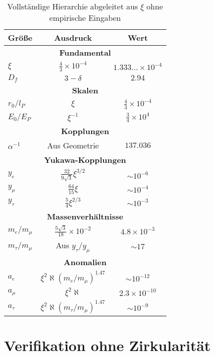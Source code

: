 \documentclass[12pt,a4paper]{article}
\newcommand{\lP}{l_P}
\newcommand{\EP}{E_P}
\newcommand{\rzero}{r_0}
\newcommand{\Ezero}{E_0}
\newcommand{\xipar}{\xi}
\begin{document}
\begin{table}[h]
	\centering
	\begin{tabular}{lcc}
		\toprule
		\textbf{Größe} & \textbf{Ausdruck} & \textbf{Wert} \\
		\midrule
		\multicolumn{3}{c}{\textbf{Fundamental}} \\
		$\xipar$ & $\frac{4}{3} \times 10^{-4}$ & $1.333\ldots \times 10^{-4}$ \\
		$D_f$ & $3 - \delta$ & $2.94$ \\
		\midrule
		\multicolumn{3}{c}{\textbf{Skalen}} \\
		$\rzero/\lP$ & $\xipar$ & $\frac{4}{3} \times 10^{-4}$ \\
		$\Ezero/\EP$ & $\xipar^{-1}$ & $\frac{3}{4} \times 10^{4}$ \\
		\midrule
		\multicolumn{3}{c}{\textbf{Kopplungen}} \\
		$\alpha^{-1}$ & Aus Geometrie & $137.036$ \\
		\midrule
		\multicolumn{3}{c}{\textbf{Yukawa-Kopplungen}} \\
		$y_e$ & $\frac{32}{9\sqrt{3}} \xipar^{3/2}$ & $\sim 10^{-6}$ \\
		$y_\mu$ & $\frac{64}{15} \xipar$ & $\sim 10^{-4}$ \\
		$y_\tau$ & $\frac{5}{4} \xipar^{2/3}$ & $\sim 10^{-3}$ \\
		\midrule
		\multicolumn{3}{c}{\textbf{Massenverhältnisse}} \\
		$m_e/m_\mu$ & $\frac{5 \sqrt{3}}{18} \times 10^{-2}$ & $4.8 \times 10^{-3}$ \\
		$m_\tau/m_\mu$ & Aus $y_\tau/y_\mu$ & $\sim 17$ \\
		\midrule
		\multicolumn{3}{c}{\textbf{Anomalien}} \\
		$a_e$ & $\xipar^2 \aleph (m_e/m_\mu)^{1.47}$ & $\sim 10^{-12}$ \\
		$a_\mu$ & $\xipar^2 \aleph$ & $2.3 \times 10^{-10}$ \\
		$a_\tau$ & $\xipar^2 \aleph (m_\tau/m_\mu)^{1.47}$ & $\sim 10^{-9}$ \\
		\bottomrule
	\end{tabular}
	\caption{Vollständige Hierarchie abgeleitet aus $\xipar$ ohne empirische Eingaben}
\end{table}

\section{Verifikation ohne Zirkularität}
\end{document}
